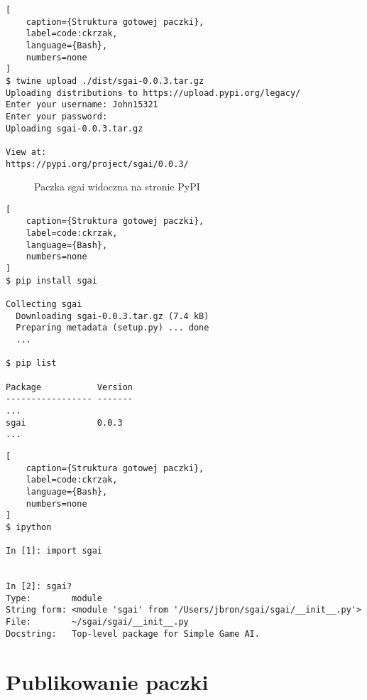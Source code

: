 \begin{onepage}
    \begin{lstlisting}[
    caption={Struktura gotowej paczki},
    label=code:ckrzak,
    language={Bash},
    numbers=none
]
$ twine upload ./dist/sgai-0.0.3.tar.gz
Uploading distributions to https://upload.pypi.org/legacy/
Enter your username: John15321
Enter your password:
Uploading sgai-0.0.3.tar.gz

View at:
https://pypi.org/project/sgai/0.0.3/
    \end{lstlisting}
\end{onepage}


\begin{figure}[h]
    \centering

    \caption{Paczka sgai widoczna na stronie PyPI}
    \label{img:sgai_on_pypi}
\end{figure}




\begin{onepage}
    \begin{lstlisting}[
    caption={Struktura gotowej paczki},
    label=code:ckrzak,
    language={Bash},
    numbers=none
]
$ pip install sgai

Collecting sgai
  Downloading sgai-0.0.3.tar.gz (7.4 kB)
  Preparing metadata (setup.py) ... done
  ...

$ pip list

Package           Version
----------------- -------
...
sgai              0.0.3
...
\end{lstlisting}
\end{onepage}



\begin{onepage}
    \begin{lstlisting}[
    caption={Struktura gotowej paczki},
    label=code:ckrzak,
    language={Bash},
    numbers=none
]
$ ipython

In [1]: import sgai


In [2]: sgai?
Type:        module
String form: <module 'sgai' from '/Users/jbron/sgai/sgai/__init__.py'>
File:        ~/sgai/sgai/__init__.py
Docstring:   Top-level package for Simple Game AI.

\end{lstlisting}
\end{onepage}






\section{Publikowanie paczki}
